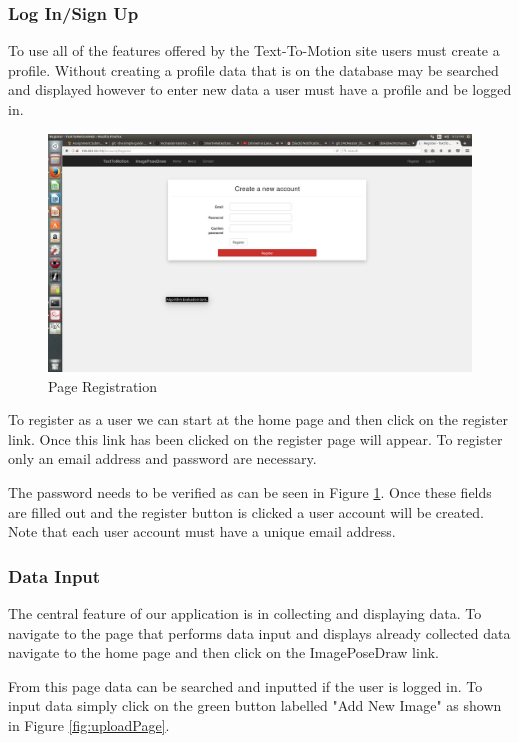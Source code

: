 \documentclass{scrreprt}
\begin{document}
\subsubsection{Log In/Sign Up}

To use all of the features offered by the Text-To-Motion site users must create
a profile.  Without creating a profile data that is on the database may be
searched and displayed however to enter new data a user must have a profile and
be logged in.

\begin{figure}
  \includegraphics[width=\linewidth]{Register.png}
  \caption{Page Registration}
  \label{fig:regPage}
\end{figure}

To register as a user we can start at the home page and then click on the
register link.  Once this link has been clicked on the register page will
appear.  To register only an email address and password are necessary.

The password needs to be verified as can be seen in Figure \ref{fig:regPage}.
Once these fields are filled out and the register button is clicked a user
account will be created.  Note that each user account must have a unique email
address.

\subsubsection{Data Input}

The central feature of our application is in collecting and displaying data.
To navigate to the page that performs data input and displays already collected
data navigate to the home page and then click on the ImagePoseDraw link.

From this page data can be searched and inputted if the user is logged in.  To
input data simply click on the green button labelled "Add New Image" as shown
in Figure \ref{fig:uploadPage}.
\end{document}
